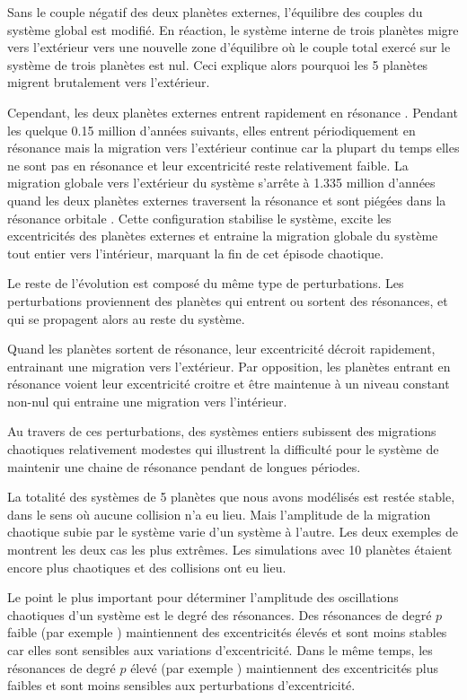 Sans le couple négatif des deux planètes externes, l'équilibre des couples du système global est modifié. En réaction, le système interne de trois planètes migre vers l'extérieur vers une nouvelle zone d'équilibre où le couple total exercé sur le système de trois planètes est nul. Ceci explique alors pourquoi les 5 planètes migrent brutalement vers l'extérieur. 

Cependant, les deux planètes externes entrent rapidement en résonance . Pendant les quelque 0.15 million d'années suivants, elles entrent périodiquement en résonance  mais la migration vers l'extérieur continue car la plupart du temps elles ne sont pas en résonance et leur excentricité reste relativement faible. La migration globale vers l'extérieur du système s'arrête à 1.335 million d'années quand les deux planètes externes traversent la résonance  et sont piégées dans la résonance orbitale . Cette configuration stabilise le système, excite les excentricités des planètes externes et entraine la migration globale du système tout entier vers l'intérieur, marquant la fin de cet épisode chaotique. 

\bigskip

Le reste de l'évolution est composé du même type de perturbations. Les perturbations proviennent des planètes qui entrent ou sortent des résonances, et qui se propagent alors au reste du système. 

Quand les planètes sortent de résonance, leur excentricité décroit rapidement, entrainant une migration vers l'extérieur. Par opposition, les planètes entrant en résonance voient leur excentricité croitre et être maintenue à un niveau constant non-nul qui entraine une migration vers l'intérieur. 

Au travers de ces perturbations, des systèmes entiers subissent des migrations chaotiques relativement modestes qui illustrent la difficulté pour le système de maintenir une chaine de résonance pendant de longues périodes. 

La totalité des systèmes de 5 planètes que nous avons modélisés est restée stable, dans le sens où aucune collision n'a eu lieu. Mais l'amplitude de la migration chaotique subie par le système varie d'un système à l'autre. Les deux exemples de  montrent les deux cas les plus extrêmes. Les simulations avec 10 planètes étaient encore plus chaotiques et des collisions ont eu lieu. 

\bigskip

Le point le plus important pour déterminer l'amplitude des oscillations chaotiques d'un système est le degré des résonances. Des résonances de degré $p$ faible (par exemple ) maintiennent des excentricités élevés et sont moins stables car elles sont sensibles aux variations d'excentricité. Dans le même temps, les résonances de degré $p$ élevé (par exemple ) maintiennent des excentricités plus faibles et sont moins sensibles aux perturbations d'excentricité.

